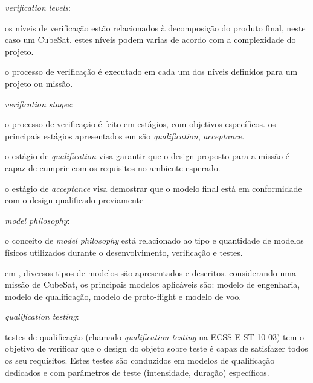 \begin{alineas}
    \item \textit{verification levels}:
    \begin{alineas}
        \item os níveis de verificação estão relacionados à decomposição do produto final, neste caso um CubeSat. estes níveis podem varias de acordo com a complexidade do projeto.
        \item o processo de verificação é executado em cada um dos níveis definidos para um projeto ou missão.
    \end{alineas}

    \item \textit{verification stages}:
    \begin{alineas}
        \item o processo de verificação é feito em estágios, com objetivos específicos. os principais estágios apresentados em \textcite{ecss-e-st-10-02} são \textit{qualification}, \textit{acceptance}.

        \item o estágio de \textit{qualification} visa garantir que o design proposto para a missão é capaz de cumprir com os requisitos no ambiente esperado.
        \item o estágio de \textit{acceptance} visa demostrar que o modelo final  está em conformidade com o design qualificado previamente
    \end{alineas}

    \item \textit{model philosophy}:
    \begin{alineas}
        \item o conceito de \textit{model philosophy} está relacionado ao tipo e quantidade de modelos físicos utilizados durante o desenvolvimento, verificação e testes.
        \item em \cite{ecss-e-hb-10-02}, diversos tipos de modelos são apresentados e descritos. considerando uma missão de CubeSat, os principais modelos aplicáveis são: modelo de engenharia, modelo de qualificação, modelo de proto-flight e modelo de voo.
    \end{alineas}

    \item \textit{qualification testing}:
    \begin{alineas}
        \item testes de qualificação (chamado \textit{qualification testing} na ECSS-E-ST-10-03) tem o objetivo de verificar que o design do objeto sobre teste é capaz de satisfazer todos os seu requisitos. Estes testes são conduzidos em modelos de qualificação dedicados e com parâmetros de teste (intensidade, duração) específicos.
    \end{alineas}


\end{alineas}
